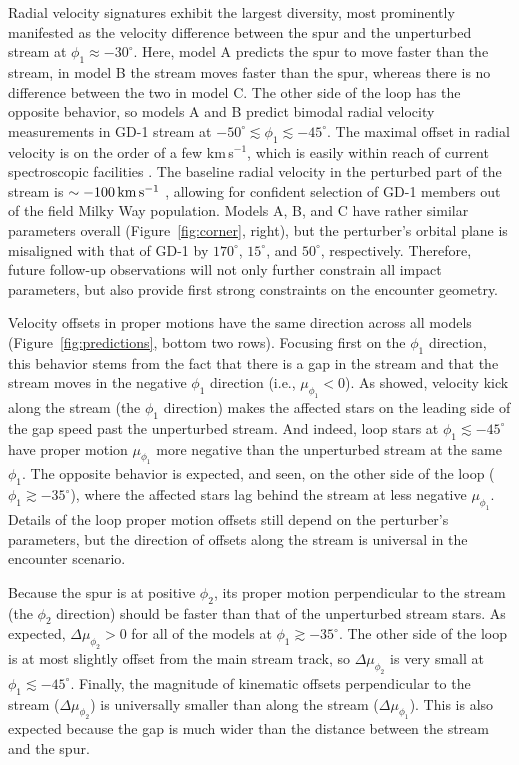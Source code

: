 \documentclass[twocolumn]{aastex62}
\begin{document}
Radial velocity signatures exhibit the largest diversity, most prominently manifested as the velocity difference between the spur and the unperturbed stream at $\phi_1\approx-30^\circ$.
Here, model A predicts the spur to move faster than the stream, in model B the stream moves faster than the spur, whereas there is no difference between the two in model C.
The other side of the loop has the opposite behavior, so models A and B predict bimodal radial velocity measurements in GD-1 stream at $-50^\circ\lesssim\phi_1\lesssim-45^\circ$.
The maximal offset in radial velocity is on the order of a few km\,s$^{-1}$, which is easily within reach of current spectroscopic facilities \citep[e.g.,][]{sg2007}.
The baseline radial velocity in the perturbed part of the stream is $\sim-100\,\rm km\,s^{-1}$ \citep{koposov2010}, allowing for confident selection of GD-1 members out of the field Milky Way population.
Models A, B, and C have rather similar parameters overall (Figure~\ref{fig:corner}, right), but the perturber's orbital plane is misaligned with that of GD-1 by $170^\circ$, $15^\circ$, and $50^\circ$, respectively.
Therefore, future follow-up observations will not only further constrain all impact parameters, but also provide first strong constraints on the encounter geometry.

Velocity offsets in proper motions have the same direction across all models (Figure~\ref{fig:predictions}, bottom two rows).
Focusing first on the $\phi_1$ direction, this behavior stems from the fact that there is a gap in the stream and that the stream moves in the negative $\phi_1$ direction (i.e., $\mu_{\phi_1}<0$).
As \citep{eb2015} showed, velocity kick along the stream (the $\phi_1$ direction) makes the affected stars on the leading side of the gap speed past the unperturbed stream.
And indeed, loop stars at $\phi_1\lesssim-45^\circ$ have proper motion $\mu_{\phi_1}$ more negative than the unperturbed stream at the same $\phi_1$.
The opposite behavior is expected, and seen, on the other side of the loop ($\phi_1\gtrsim-35^\circ$), where the affected stars lag behind the stream at less negative $\mu_{\phi_1}$.
Details of the loop proper motion offsets still depend on the perturber's parameters, but the direction of offsets along the stream is universal in the encounter scenario.

Because the spur is at positive $\phi_2$, its proper motion perpendicular to the stream (the $\phi_2$ direction) should be faster than that of the unperturbed stream stars.
As expected, $\Delta\mu_{\phi_2}>0$ for all of the models at $\phi_1\gtrsim-35^\circ$.
The other side of the loop is at most slightly offset from the main stream track, so $\Delta\mu_{\phi_2}$ is very small at $\phi_1\lesssim-45^\circ$.
Finally, the magnitude of kinematic offsets perpendicular to the stream ($\Delta\mu_{\phi_2}$) is universally smaller than along the stream ($\Delta\mu_{\phi_1}$).
This is also expected because the gap is much wider than the distance between the stream and the spur.
\end{document}
